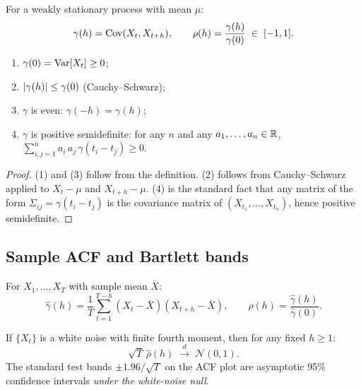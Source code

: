 \begin{defbox}
For a weakly stationary process with mean $\mu$:
\[
  \gamma(h) = \mathrm{Cov}(X_t, X_{t+h}),
  \qquad
  \rho(h) = \frac{\gamma(h)}{\gamma(0)} \;\in\; [-1, 1].
\]
\end{defbox}

\begin{propbox}
\label{prop:acvf}
\begin{enumerate}
  \item $\gamma(0) = \mathrm{Var}[X_t] \geq 0$;
  \item $\left\lvert \gamma(h) \right\rvert \leq \gamma(0)$ (Cauchy--Schwarz);
  \item $\gamma$ is even: $\gamma(-h) = \gamma(h)$;
  \item $\gamma$ is positive semidefinite: for any $n$ and any
        $a_1, \dots, a_n \in \mathbb{R}$,
        $\sum_{i, j = 1}^{n} a_i\, a_j\, \gamma(t_i - t_j) \geq 0$.
\end{enumerate}
\end{propbox}

\begin{proof}
(1) and (3) follow from the definition. (2) follows from Cauchy--Schwarz
applied to $X_t - \mu$ and $X_{t+h} - \mu$. (4) is the standard fact
that any matrix of the form $\Sigma_{ij} = \gamma(t_i - t_j)$ is the
covariance matrix of $(X_{t_1}, \dots, X_{t_n})$, hence positive
semidefinite.
\end{proof}

\subsection{Sample ACF and Bartlett bands}

\begin{defbox}
For $X_1, \dots, X_T$ with sample mean $\bar X$:
\[
  \widehat\gamma(h) = \frac{1}{T}\sum_{t = 1}^{T - h}
    (X_t - \bar X)(X_{t+h} - \bar X),
  \qquad
  \widehat\rho(h) = \frac{\widehat\gamma(h)}{\widehat\gamma(0)}.
\]
\end{defbox}

\begin{thbox}
\label{th:bartlett}
If $\{X_t\}$ is a white noise with finite fourth moment, then for any
fixed $h \geq 1$:
\[
  \sqrt{T}\,\widehat\rho(h) \;\xrightarrow{d}\; \mathcal{N}(0, 1).
\]
The standard test bands $\pm 1.96 / \sqrt{T}$ on the ACF plot are
asymptotic 95\% confidence intervals \emph{under the white-noise null}.
\end{thbox}

